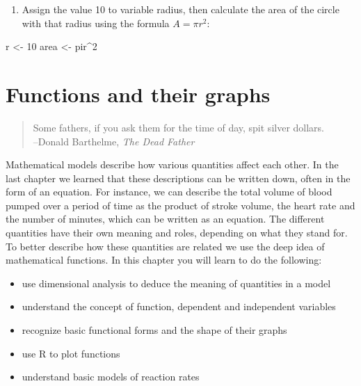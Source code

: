\documentclass[
  letterpaper,
  DIV=11,
  numbers=noendperiod]{scrreprt}
\newenvironment{Shaded}{\begin{snugshade}}{\end{snugshade}}
\newcommand{\DecValTok}[1]{\textcolor[rgb]{0.68,0.00,0.00}{#1}}
\newcommand{\NormalTok}[1]{\textcolor[rgb]{0.00,0.23,0.31}{#1}}
\newcommand{\OtherTok}[1]{\textcolor[rgb]{0.00,0.23,0.31}{#1}}
\newcommand{\SpecialCharTok}[1]{\textcolor[rgb]{0.37,0.37,0.37}{#1}}
\providecommand{\tightlist}{%
  \setlength{\itemsep}{0pt}\setlength{\parskip}{0pt}}\usepackage{longtable,booktabs,array}
\begin{document}
\begin{enumerate}
\def\labelenumi{\arabic{enumi}.}
\setcounter{enumi}{9}
\tightlist
\item
  Assign the value 10 to variable radius, then calculate the area of the
  circle with that radius using the formula \(A = \pi r^2\):
\end{enumerate}

\begin{Shaded}
\begin{Highlighting}[]
\NormalTok{r }\OtherTok{\textless{}{-}} \DecValTok{10}
\NormalTok{area }\OtherTok{\textless{}{-}}\NormalTok{ pir}\SpecialCharTok{\^{}}\DecValTok{2} 
\end{Highlighting}
\end{Shaded}


\hypertarget{functions-and-their-graphs}{%
\chapter{Functions and their graphs}\label{functions-and-their-graphs}}

\begin{quote}
Some fathers, if you ask them for the time of day, spit silver
dollars.\\
--Donald Barthelme, \emph{The Dead Father}
\end{quote}

Mathematical models describe how various quantities affect each other.
In the last chapter we learned that these descriptions can be written
down, often in the form of an equation. For instance, we can describe
the total volume of blood pumped over a period of time as the product of
stroke volume, the heart rate and the number of minutes, which can be
written as an equation. The different quantities have their own meaning
and roles, depending on what they stand for. To better describe how
these quantities are related we use the deep idea of mathematical
functions. In this chapter you will learn to do the following:

\begin{itemize}
\tightlist
\item
  use dimensional analysis to deduce the meaning of quantities in a
  model
\item
  understand the concept of function, dependent and independent
  variables
\item
  recognize basic functional forms and the shape of their graphs
\item
  use R to plot functions
\item
  understand basic models of reaction rates
\end{itemize}
\end{document}
